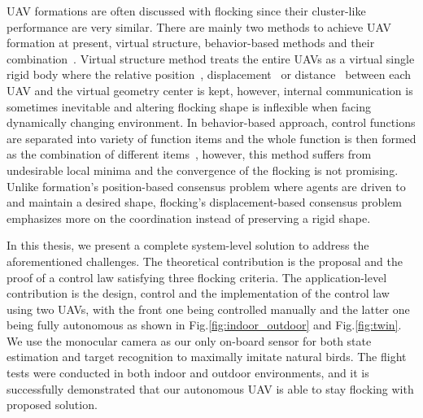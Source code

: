 UAV formations are often discussed with flocking since their cluster-like performance are very similar. There are mainly two methods to achieve UAV formation at present, virtual structure, behavior-based methods and their combination~\cite{Cai2012,VLAP}. Virtual structure method treats the entire UAVs as a virtual single rigid body where the relative position~\cite{Virtual2008,LQR2014,VirtualLeader}, displacement~\cite{Askari2015,Bearing2016} or distance~\cite{RAS} between each UAV and the virtual geometry center is kept, however, internal communication is sometimes inevitable and altering flocking shape is inflexible when facing dynamically changing environment. In behavior-based approach, control functions are separated into variety of function items and the whole function is then formed as the combination of different items~\cite{Zhang2018,Martin2014,Vicsek2018,VLAP,Behavior2004}, however, this method suffers from undesirable local minima and the convergence of the flocking is not promising. Unlike formation's position-based consensus problem where agents are driven to and maintain a desired shape, flocking's displacement-based consensus problem emphasizes more on the coordination instead of preserving a rigid shape.

In this thesis, we present a complete system-level solution to address the aforementioned challenges. The theoretical contribution is the proposal and the proof of a control law satisfying three flocking criteria. The application-level contribution is the design, control and the implementation of the control law using two UAVs, with the front one being controlled manually and the latter one being fully autonomous as shown in Fig.\ref{fig:indoor_outdoor} and Fig.\ref{fig:twin}. We use the monocular camera as our only on-board sensor for both state estimation and target recognition to maximally imitate natural birds. The flight tests were conducted in both indoor and outdoor environments, and it is successfully demonstrated that our autonomous UAV is able to stay flocking with proposed solution.

